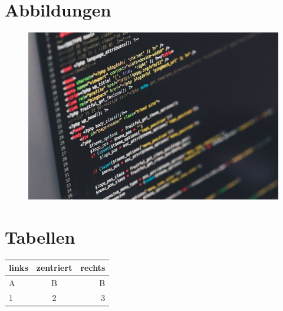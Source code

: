 \section{Abbildungen}
\begin{figure}
    \centering                                                                      %
    \includegraphics[width=.9\linewidth]{ba_abbildungen/testimage}                  %
\end{figure}

\section{Tabellen}
\begin{table}
    \centering                                                                      %
    \begin{tabular}{l|c|r}\hline\hline                                              %
        links & zentriert & rechts \\\hline A & B & B\\\cline{2-2}                  %
        1 & 2 & 3\\\hline
    \end{tabular}
\end{table} 

\newpage